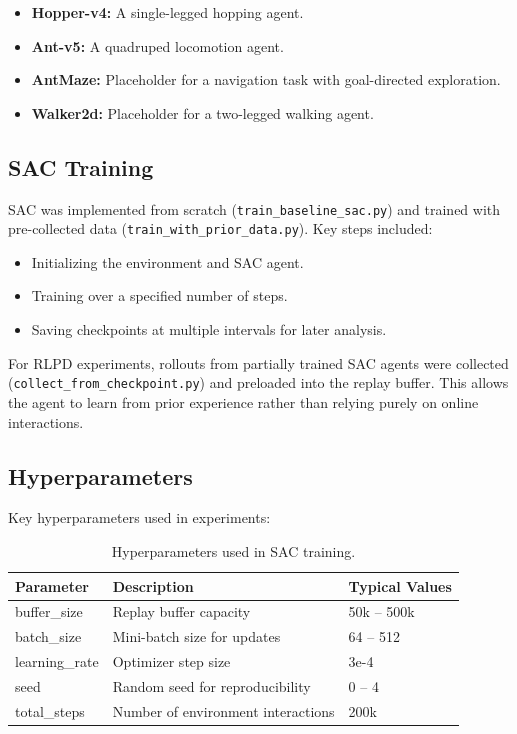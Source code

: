 \documentclass[12pt]{article}
\begin{document}
\begin{itemize}
    \item \textbf{Hopper-v4:} A single-legged hopping agent.
    \item \textbf{Ant-v5:} A quadruped locomotion agent.
    \item \textbf{AntMaze:} Placeholder for a navigation task with goal-directed exploration.
    \item \textbf{Walker2d:} Placeholder for a two-legged walking agent.
\end{itemize}

\subsection{SAC Training}
SAC was implemented from scratch (\texttt{train\_baseline\_sac.py}) and trained with pre-collected data (\texttt{train\_with\_prior\_data.py}). Key steps included:

\begin{itemize}
    \item Initializing the environment and SAC agent.
    \item Training over a specified number of steps.
    \item Saving checkpoints at multiple intervals for later analysis.
\end{itemize}

For RLPD experiments, rollouts from partially trained SAC agents were collected (\texttt{collect\_from\_checkpoint.py}) and preloaded into the replay buffer. This allows the agent to learn from prior experience rather than relying purely on online interactions.

\subsection{Hyperparameters}
Key hyperparameters used in experiments:

\begin{table}[H]
\centering
\begin{tabular}{l l l}
\toprule
Parameter & Description & Typical Values \\
\midrule
buffer\_size & Replay buffer capacity & 50k -- 500k \\
batch\_size & Mini-batch size for updates & 64 -- 512 \\
learning\_rate & Optimizer step size & 3e-4 \\
seed & Random seed for reproducibility & 0 -- 4 \\
total\_steps & Number of environment interactions & 200k \\
\bottomrule
\end{tabular}
\caption{Hyperparameters used in SAC training.}
\end{table}
\end{document}
